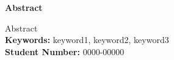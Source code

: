 \thispagestyle{plain}
\begin{center}
    \Large
    \textbf{Abstract}
\end{center}

Abstract\\

\textbf{Keywords:} keyword1, keyword2, keyword3 \\

\textbf{Student Number:} 0000-00000

